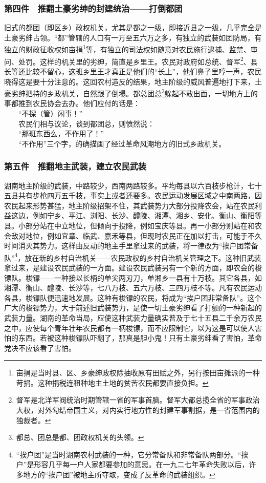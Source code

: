 \documentclass[cn,11pt,chinese]{elegantbook}
\def\myformat#1{\hfil\hfil #1}
\begin{document}
\subsubsection*{\myformat{第四件　推翻土豪劣绅的封建统治——打倒都团}}
旧式的都团（即区乡）政权机关，尤其是都之一级，即接近县之一级，几乎完全是土豪劣绅占领。“都”管辖的人口有一万至五六万之多，有独立的武装如团防局，有独立的财政征收权如亩捐\footnote[13]{ 亩捐是当时县、区、乡豪绅政权除抽收原有田赋之外，另行按田亩摊派的一种苛捐。这种捐税连租种地主土地的贫苦农民都要直接负担。}等，有独立的司法权如随意对农民施行逮捕、监禁、审问、处罚。这样的机关里的劣绅，简直是乡里王。农民对政府如总统、督军\footnote[14]{ 督军是北洋军阀统治时期管辖一省的军事首脑。督军大都总揽全省的军事政治大权，对外勾结帝国主义，对内实行地方性的封建军事割据，是一省范围内的独裁者。}、县长等还比较不留心，这班乡里王才真正是他们的“长上”，他们鼻子里哼一声，农民晓得这是要十分注意的。这回农村造反的结果，地主阶级的威风普遍地打下来，土豪劣绅把持的乡政机关，自然跟了倒塌。都总团总\footnote[15]{ 都总、团总是都、团政权机关的头领。}躲起不敢出面，一切地方上的事都推到农民协会去办。他们应付的话是：\\
　　“不探（管）闲事！”\\
　　农民们相与议论，谈到都团总，则愤然说：\\
　　“那班东西么，不作用了！”\\
　　“不作用”三个字，的确描画了经过革命风潮地方的旧式乡政机关。\\
\subsubsection*{\myformat{第五件　推翻地主武装，建立农民武装}}
湖南地主阶级的武装，中路较少，西南两路较多。平均每县以六百枝步枪计，七十五县共有步枪四万五千枝，事实上或者还要多。农民运动发展区域之中南两路，因农民起来形势甚猛，地主阶级招架不住，其武装势力大部分投降农会，站在农民利益这边，例如宁乡、平江、浏阳、长沙、醴陵、湘潭、湘乡、安化、衡山、衡阳等县。小部分站在中立地位，但倾向于投降，例如宝庆等县。再一小部分则站在和农会敌对地位，例如宜章、临武、嘉禾等县，但现时农民正在加以打击，可能于不久时间消灭其势力。这样由反动的地主手里拿过来的武装，将一律改为“挨户团常备队”\footnote[16]{ “挨户团”是当时湖南农村武装的一种，它分常备队和非常备队两部分。“挨户”是形容几乎每一户人家都要参加的意思。在一九二七年革命失败以后，许多地方的“挨户团”被地主所夺取，变成了反革命的武装组织。}，放在新的乡村自治机关——农民政权的乡村自治机关管理之下。这种旧武装拿过来，是建设农民武装的一方面。建设农民武装另有一个新的方面，即农会的梭镖队。梭镖——一种接以长柄的单尖两刃刀，单湘乡一县有十万枝。其它各县，如湘潭、衡山、醴陵、长沙等，七八万枝、五六万枝、三四万枝不等。凡有农民运动各县，梭镖队便迅速地发展。这种有梭镖的农民，将成为“挨户团非常备队”。这个广大的梭镖势力，大于前述旧武装势力，是使一切土豪劣绅看了打颤的一种新起的武装力量。湖南的革命当局，应使这种武装力量确实普及于七十五县二千余万农民之中，应使每个青年壮年农民都有一柄梭镖，而不应限制它，以为这是可以使人害怕的东西。若被这种梭镖队吓翻了，那真是胆小鬼！只有土豪劣绅看了害怕，革命党决不应该看了害怕。\\
\end{document}
